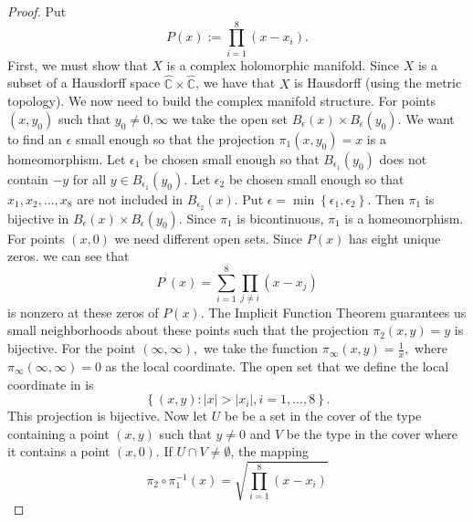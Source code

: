 \documentclass[12pt,oneside,final]{siuethesis}
\theoremstyle{definition}
\begin{document}
\begin{proof}
Put 
\begin{equation*}
P\left( x\right) :=\prod\limits_{i=1}^{8}\left( x-x_{i}\right).
\end{equation*}
First, we must show that $X$ is a complex holomorphic manifold. Since $X$ is a subset of a Hausdorff space $\hat{\mathbb{C}}\times \hat{\mathbb{C}}$, we have that $X$ is Hausdorff (using the metric topology). We now need to build the complex manifold structure. For points $\left( x,y_{0}\right) $ such that $y_{0}\neq 0,\infty $ we take the open set $B_{\epsilon }\left( x\right) \times B_{\epsilon
}\left( y_{0}\right)$. We want to find an $\epsilon $ small enough so that the projection $\pi _{1}\left( x,y_{0}\right) =x$ is a homeomorphism. Let $
\epsilon _{1}$ be chosen small enough so that $B_{\epsilon _{1}}\left(y_{0}\right) $ does not contain $-y$ for all $y\in B_{\epsilon _{1}}\left(
y_{0}\right).$ Let $\epsilon _{2}$ be chosen small enough so that $x_{1},x_{2},...,x_{8}$ are not included in $B_{\epsilon _{2}}\left( x\right)
.$ Put $\epsilon =\min \left\{ \epsilon _{1},\epsilon _{2}\right\}$. Then $\pi _{1}$ is bijective in $B_{\epsilon }\left( x\right) \times B_{\epsilon
}\left( y_{0}\right) $. Since $\pi _{1}$ is bicontinuous, $\pi_{1}$ is a homeomorphism. For points $\left( x,0\right) $ we need different
open sets. Since $P\left( x\right) $ has eight unique zeros. we can see that
\begin{equation*}
P^{^{\prime }}\left( x\right) =\sum_{i=1}^{8}\prod\limits_{j\neq i}\left(
x-x_{j}\right)
\end{equation*}
is nonzero at these zeros of $P\left( x\right)$. The Implicit Function Theorem guarantees us small neighborhoods about these points such that the
projection $\pi _{2}\left( x,y\right) =y$ is bijective. For the point $\left( \infty ,\infty \right) ,$ we take the function $\pi _{\infty }\left(
x,y\right) =\frac{1}{x},$ where $\pi _{\infty }\left( \infty ,\infty \right) =0$ as the local coordinate. The open set that we define the local
coordinate in is $$\left\{ \left( x,y\right) :\left\vert x\right\vert>\left\vert x_{i}\right\vert ,i=1,...,8\right\}.$$ This projection is bijective. Now let $U$ be be a set in the cover of the type containing a point $\left( x,y\right) $ such that $y\neq 0$ and $V$ be
the type in the cover where it contains a point $\left( x,0\right).$ If $U\cap V\neq \emptyset$, the mapping 
\begin{equation*}
\pi _{2}\circ \pi _{1}^{-1}\left( x\right) =\sqrt{\prod\limits_{i=1}^{8}
\left( x-x_{i}\right) }

\end{equation*}
\end{proof}
\end{document}

